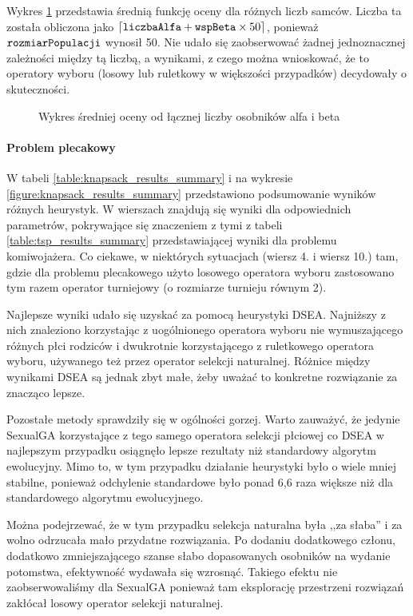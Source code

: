 \documentclass[./FM_mgr.tex]{subfiles}
\begin{document}
Wykres \ref{figure:tsp_male_avg} przedstawia średnią funkcję oceny dla różnych liczb samców.
Liczba ta została obliczona jako $\lceil \mathtt{liczbaAlfa} + \mathtt{wspBeta} \times 50 \rceil$, ponieważ $\mathtt{rozmiarPopulacji}$ wynosił 50.
Nie udało się zaobserwować żadnej jednoznacznej zależności między tą liczbą, a wynikami, z czego można wnioskować, że to operatory wyboru (losowy lub ruletkowy w większości przypadków) decydowały o skuteczności.

\newpage

\begin{figure}[H]
	\caption{Wykres średniej oceny od łącznej liczby osobników alfa i beta \label{figure:tsp_male_avg}}
	\centering
\end{figure}

\paragraph{Problem plecakowy}

W tabeli \ref{table:knapsack_results_summary} i na wykresie \ref{figure:knapsack_results_summary} przedstawiono podsumowanie wyników różnych heurystyk. 
W wierszach znajdują się wyniki dla odpowiednich parametrów, pokrywające się znaczeniem z tymi z tabeli \ref{table:tsp_results_summary} przedstawiającej wyniki dla problemu komiwojażera.
Co ciekawe, w niektórych sytuacjach (wiersz 4. i wiersz 10.) tam, gdzie dla problemu plecakowego użyto losowego operatora wyboru zastosowano tym razem operator turniejowy (o rozmiarze turnieju równym 2).

Najlepsze wyniki udało się uzyskać za pomocą heurystyki DSEA. 
Najniższy z nich znaleziono korzystając z uogólnionego operatora wyboru nie wymuszającego różnych płci rodziców i dwukrotnie korzystającego z ruletkowego operatora wyboru, używanego też przez operator selekcji naturalnej.
Różnice między wynikami DSEA są jednak zbyt małe, żeby uważać to konkretne rozwiązanie za znacząco lepsze.

Pozostałe metody sprawdziły się w ogólności gorzej.
Warto zauważyć, że jedynie SexualGA korzystające z tego samego operatora selekcji płciowej co DSEA w najlepszym przypadku osiągnęło lepsze rezultaty niż standardowy algorytm ewolucyjny.
Mimo to, w tym przypadku działanie heurystyki było o wiele mniej stabilne, ponieważ odchylenie standardowe było ponad 6,6 raza większe niż dla standardowego algorytmu ewolucyjnego.

Można podejrzewać, że w tym przypadku selekcja naturalna była ,,za słaba'' i za wolno odrzucała mało przydatne rozwiązania.
Po dodaniu dodatkowego członu, dodatkowo zmniejszającego szanse słabo dopasowanych osobników na wydanie potomstwa, efektywność wydawała się wzrosnąć.
Takiego efektu nie zaobserwowaliśmy dla SexualGA ponieważ tam eksplorację przestrzeni rozwiązań zakłócał losowy operator selekcji naturalnej.
\end{document}
